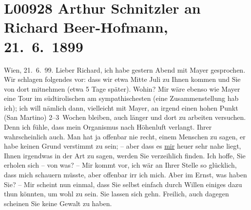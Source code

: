 

\section[Arthur Schnitzler an Richard Beer-Hofmann, 21. 6. 1899]{L00928 Arthur Schnitzler an Richard Beer-Hofmann, 21. 6. 1899}
\nopagebreak{}
\rehead{ }\normalsize\beginnumbering{}
\toendnotes[C]{\smallbreak\pagebreak[2]}
\toendnotes[C]{\smallbreak}
\pstart
           \raggedleft{}{\pb}Wien, 21. 6. 99.\pend
           \vspace{0.5em}
\pstart
           Lieber Richard, ich habe gestern Abend mit Mayer gesprochen. Wir schlagen folgendes vor: dass wir etwa
                  Mitte Juli zu Ihnen kommen und Sie von dort mitnehmen (etwa 5 Tage
               später). Wohin? Mir wäre ebenso wie Mayer eine
               Tour im südtirolischen am sympathischesten (eine
               Zusammenstellung hab ich); ich will nämlich dann, vielleicht mit Mayer, an irgend einen hohen Punkt (San Martino) 2–3 Wochen bleiben, auch länger und dort zu
               arbeiten versuchen. Denn ich fühle, dass mein Organismus nach Höhenluft verlangt.
               Ihrer wahrscheinlich auch. Man hat ja offenbar nie recht, einem Menschen zu sagen, er
               habe keinen Grund verstimmt zu sein; – aber dass es \uline{mir} heuer sehr nahe liegt, Ihnen irgendwas in der Art zu sagen, werden Sie
               verzeihlich finden. Ich hoffe, Sie erholen sich – von was? – Mir kommt vor, ich wär
               an Ihrer Stelle so glücklich, dass mich schauern müsste, aber offenbar irr ich mich.
               Aber im Ernst, was haben Sie? – Mir scheint nun einmal, dass Sie selbst einfach durch
               Willen einiges dazu thun könnten, um wohl zu sein. Sie lassen sich gehn. Freilich,
               auch dagegen scheinen Sie keine Gewalt zu haben.\pend
           
